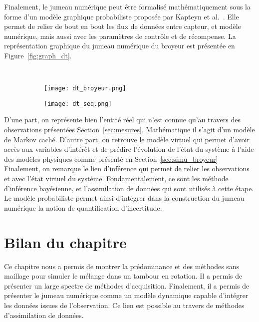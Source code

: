 Finalement, le jumeau numérique peut être formalisé mathématiquement sous la forme d'un modèle graphique probabiliste proposée par Kapteyn et al.~\cite{kapteyn_probabilistic_2021}.
Elle permet de relier de bout en bout les flux de données entre capteur, et modèle numérique, mais aussi avec les paramètres de contrôle et de récompense. La représentation graphique du jumeau numérique du broyeur est présentée en Figure~\ref{fig:graph_dt}.

\begin{figure}~\label{fig:graph_dt}
    \centering
    \begin{subfigure}{0.49\textwidth}
        \texttt{[image: dt\_broyeur.png]}
    \end{subfigure}
    \begin{subfigure}{0.49\textwidth}
        \texttt{[image: dt\_seq.png]}
    \end{subfigure}
\end{figure}

D'une part, on représente bien l'entité réel qui n'est connue qu'au travers des observations présentées Section~\ref{sec:mesures}. Mathématique il s'agit d'un modèle de Markov caché. D'autre part, on retrouve le modèle virtuel qui permet d'avoir accès aux variables d'intérêt et de prédire l'évolution de l'état du système à l'aide des modèles physiques comme présenté en Section~\ref{sec:simu_broyeur}
Finalement, on remarque le lien d'inférence qui permet de relier les observations et avec l'état virtuel du système. Fondamentalement, ce sont les méthode d'inférence bayésienne, et l'assimilation de données qui sont utilisés à cette étape.
Le modèle probabiliste permet ainsi d'intégrer dans la construction du jumeau numérique la notion de quantification d'incertitude.

\section{Bilan du chapitre}

Ce chapitre nous a permis de montrer la prédominance et des méthodes sans maillage pour simuler le mélange dans un tambour en rotation. Il a permis de présenter un large spectre de méthodes d'acquisition. Finalement, il a permis de présenter le jumeau numérique comme un modèle dynamique capable d'intégrer les données issues de l'observation. Ce lien est possible au travers de méthodes d'assimilation de données.




